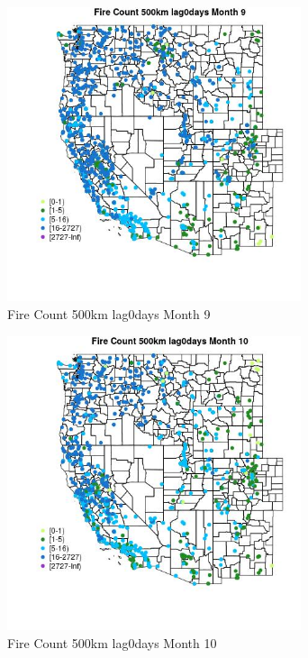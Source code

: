 \begin{figure} 
\centering  
\includegraphics[width=0.77\textwidth]{Code_Outputs/Report_ML_input_PM25_Step4_part_f_de_duplicated_aveswNAs_MapObsMo9Fire_Count_500km_lag0days.jpg} 
\caption{\label{fig:Report_ML_input_PM25_Step4_part_f_de_duplicated_aveswNAsMapObsMo9Fire_Count_500km_lag0days}Fire Count 500km lag0days Month 9} 
\end{figure} 
 

\begin{figure} 
\centering  
\includegraphics[width=0.77\textwidth]{Code_Outputs/Report_ML_input_PM25_Step4_part_f_de_duplicated_aveswNAs_MapObsMo10Fire_Count_500km_lag0days.jpg} 
\caption{\label{fig:Report_ML_input_PM25_Step4_part_f_de_duplicated_aveswNAsMapObsMo10Fire_Count_500km_lag0days}Fire Count 500km lag0days Month 10} 
\end{figure} 
 

